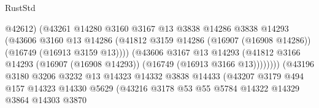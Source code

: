 \begin{lexlean}{RustStd}
\begin{coremodule}
                                          @42612)
                                        (@43261
                                          @14280
                                          @3160
                                          @3167
                                          @13
                                          @3838
                                          @14286
                                          @3838
                                          @14293
                                          (@43606
                                            @3160
                                            @13
                                            @14286
                                            (@41812
                                              @3159
                                              @14286
                                              (@16907 (@16908 @14286))
                                              (@16749 (@16913 @3159 @13))))
                                          (@43606
                                            @3167
                                            @13
                                            @14293
                                            (@41812
                                              @3166
                                              @14293
                                              (@16907 (@16908 @14293))
                                              (@16749 (@16913 @3166 @13))))))))
                                  (@43196
                                    @3180
                                    @3206
                                    @3232
                                    @13
                                    @14323
                                    @14332
                                    @3838
                                    @14433
                                    (@43207
                                      @3179
                                      @494
                                      @157
                                      @14323
                                      @14330
                                      @5629
                                      (@43216
                                        @3178
                                        @53
                                        @55
                                        @5784
                                        @14322
                                        @14329
                                        @3864
                                        @14303
                                        @3870

\end{coremodule}
\end{lexlean}
